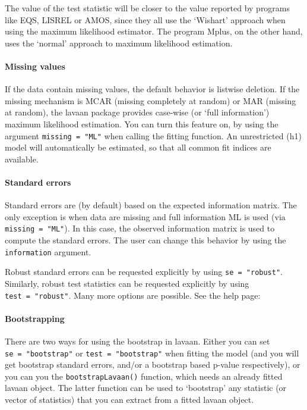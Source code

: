 The value of the test statistic will be closer to the value reported by
programs like EQS, LISREL or AMOS, since they all use the `Wishart'
approach when using the maximum likelihood estimator. The program Mplus,
on the other hand, uses the `normal' approach to maximum likelihood
estimation.

\hypertarget{missing-values}{%
\paragraph{Missing values}\label{missing-values}}

If the data contain missing values, the default behavior is listwise
deletion. If the missing mechanism is MCAR (missing completely at
random) or MAR (missing at random), the lavaan package provides
case-wise (or `full information') maximum likelihood estimation. You can
turn this feature on, by using the argument \texttt{missing\ =\ "ML"}
when calling the fitting function. An unrestricted (h1) model will
automatically be estimated, so that all common fit indices are
available.

\hypertarget{standard-errors}{%
\paragraph{Standard errors}\label{standard-errors}}

Standard errors are (by default) based on the expected information
matrix. The only exception is when data are missing and full information
ML is used (via \texttt{missing\ =\ "ML"}). In this case, the observed
information matrix is used to compute the standard errors. The user can
change this behavior by using the \texttt{information} argument.

Robust standard errors can be requested explicitly by using
\texttt{se\ =\ "robust"}. Similarly, robust test statistics can be
requested explicitly by using \texttt{test\ =\ "robust"}. Many more
options are possible. See the help page:

\begin{Shaded}
\begin{Highlighting}[]
\end{Highlighting}
\end{Shaded}

\hypertarget{bootstrapping}{%
\paragraph{Bootstrapping}\label{bootstrapping}}

There are two ways for using the bootstrap in lavaan. Either you can set
\texttt{se\ =\ "bootstrap"} or \texttt{test\ =\ "bootstrap"} when
fitting the model (and you will get bootstrap standard errors, and/or a
bootstrap based p-value respectively), or you can you the
\texttt{bootstrapLavaan()} function, which needs an already fitted
lavaan object. The latter function can be used to `bootstrap' any
statistic (or vector of statistics) that you can extract from a fitted
lavaan object.

